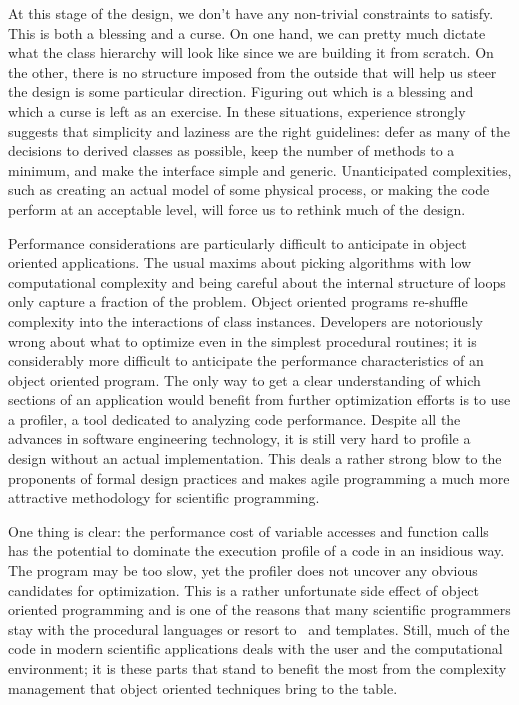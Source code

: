 At this stage of the design, we don't have any non-trivial constraints to satisfy. This is both
a blessing and a curse. On one hand, we can pretty much dictate what the class hierarchy will
look like since we are building it from scratch. On the other, there is no structure imposed
from the outside that will help us steer the design is some particular direction. Figuring out
which is a blessing and which a curse is left as an exercise. In these situations, experience
strongly suggests that simplicity and laziness are the right guidelines: defer as many of the
decisions to derived classes as possible, keep the number of methods to a minimum, and make the
interface simple and generic. Unanticipated complexities, such as creating an actual model of
some physical process, or making the code perform at an acceptable level, will force us to
rethink much of the design.

Performance considerations are particularly difficult to anticipate in object oriented
applications. The usual maxims about picking algorithms with low computational complexity and
being careful about the internal structure of loops only capture a fraction of the problem.
Object oriented programs re-shuffle complexity into the interactions of class instances.
Developers are notoriously wrong about what to optimize even in the simplest procedural
routines; it is considerably more difficult to anticipate the performance characteristics of an
object oriented program. The only way to get a clear understanding of which sections of an
application would benefit from further optimization efforts is to use a profiler, a tool
dedicated to analyzing code performance. Despite all the advances in software engineering
technology, it is still very hard to profile a design without an actual implementation. This
deals a rather strong blow to the proponents of formal design practices and makes agile
programming a much more attractive methodology for scientific programming.

One thing is clear: the performance cost of variable accesses and function calls has the
potential to dominate the execution profile of a code in an insidious way. The program may be
too slow, yet the profiler does not uncover any obvious candidates for optimization. This is a
rather unfortunate side effect of object oriented programming and is one of the reasons that
many scientific programmers stay with the procedural languages or resort to \cpp\ and
templates. Still, much of the code in modern scientific applications deals with the user and
the computational environment; it is these parts that stand to benefit the most from the
complexity management that object oriented techniques bring to the table.

